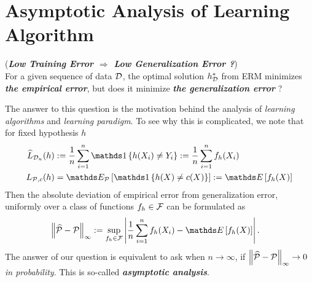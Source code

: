 \documentclass[11pt]{article}
\begin{document}
\section{Asymptotic Analysis of Learning Algorithm}
 \begin{remark} (\textbf{\emph{Low Training Error $\Rightarrow$ Low Generalization Error ?}}) \\
 For a given sequence of data ${\mathcal D}$, the optimal solution $h^{*}_{{\mathcal D}}$ from ERM minimizes \emph{\textbf{the empirical error}}, but does it minimize \emph{\textbf{the generalization error}} ? 

The answer to this question is the motivation behind the analysis of \emph{learning algorithms} and \emph{learning paradigm}. To see why this is complicated, we note that for fixed hypothesis $h$
\begin{align*}
\widehat{L}_{\cD_n}(h) &:=  \frac{1}{n}\sum_{i=1}^{n}\ind{h(X_i)\neq Y_i} := \frac{1}{n}\sum_{i=1}^n f_h(X_i) \\
L_{\cP, c}(h)  &=  \E{\cP}{\ind{h(X)\neq c(X)}} := \E{}{f_h(X)}
\end{align*} Then the absolute deviation of empirical error from generalization error, uniformly over a class of functions $f_h \in {\mathcal F}$ can be formulated as 
\begin{align*}
\norm{\widehat{\cP} - \cP}{\infty} &:= \sup_{f_h \in \cF}\abs{\frac{1}{n}\sum_{i=1}^n f_h(X_i) - \E{}{f_h(X)} }.
\end{align*} The answer of our question is equivalent to ask when $n \to \infty$, if $\left\|\widehat{{\mathcal P}} - {\mathcal P}\right\|_{\infty} \to 0$  \emph{in probability}. This is so-called \emph{\textbf{asymptotic analysis}}. 
\end{remark}
\end{document}
